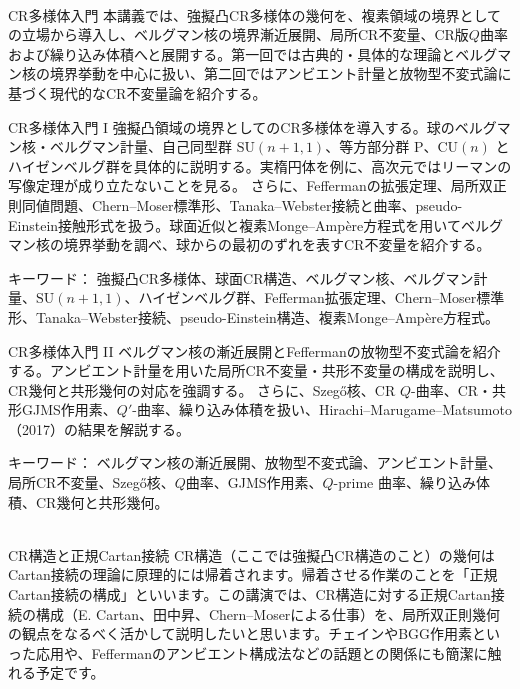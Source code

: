 \documentclass[dvipdfmx,a4paper,12pt]{article}
\theoremstyle{plain} %
\theoremstyle{definition} %
\begin{document}
\newpage

\vskip5mm

\vskip5mm


 \\
CR多様体入門
\vskip3mm
本講義では、強擬凸CR多様体の幾何を、複素領域の境界としての立場から導入し、ベルグマン核の境界漸近展開、局所CR不変量、CR版\(Q\)曲率および繰り込み体積へと展開する。第一回では古典的・具体的な理論とベルグマン核の境界挙動を中心に扱い、第二回ではアンビエント計量と放物型不変式論に基づく現代的なCR不変量論を紹介する。
\vskip8mm


CR多様体入門 I
\vskip3mm
強擬凸領域の境界としてのCR多様体を導入する。球のベルグマン核・ベルグマン計量、自己同型群 \(\mathrm{SU}(n+1,1)\)、等方部分群 \(\mathrm{P}\)、\(\mathrm{CU}(n)\) とハイゼンベルグ群を具体的に説明する。実楕円体を例に、高次元ではリーマンの写像定理が成り立たないことを見る。
さらに、Feffermanの拡張定理、局所双正則同値問題、Chern--Moser標準形、Tanaka--Webster接続と曲率、pseudo-Einstein接触形式を扱う。球面近似と複素Monge--Amp\`ere方程式を用いてベルグマン核の境界挙動を調べ、球からの最初のずれを表すCR不変量を紹介する。

\vskip1mm
キーワード： 強擬凸CR多様体、球面CR構造、ベルグマン核、ベルグマン計量、\(\mathrm{SU}(n+1,1)\)、ハイゼンベルグ群、Fefferman拡張定理、Chern--Moser標準形、Tanaka--Webster接続、pseudo-Einstein構造、複素Monge--Amp\`ere方程式。
\vskip8mm


CR多様体入門 II
\vskip3mm
ベルグマン核の漸近展開とFeffermanの放物型不変式論を紹介する。アンビエント計量を用いた局所CR不変量・共形不変量の構成を説明し、CR幾何と共形幾何の対応を強調する。
さらに、Szeg\H{o}核、CR \(Q\)-曲率、CR・共形GJMS作用素、\(Q'\)-曲率、繰り込み体積を扱い、Hirachi--Marugame--Matsumoto（2017）の結果を解説する。

\vskip1mm
キーワード： ベルグマン核の漸近展開、放物型不変式論、アンビエント計量、局所CR不変量、Szeg\H{o}核、\(Q\)曲率、GJMS作用素、\(Q\)-prime 曲率、繰り込み体積、CR幾何と共形幾何。
\vskip8mm

\newpage

\vskip5mm

\\
CR構造と正規Cartan接続
\vskip3mm
CR構造（ここでは強擬凸CR構造のこと）の幾何はCartan接続の理論に原理的には帰着されます。帰着させる作業のことを「正規Cartan接続の構成」といいます。この講演では、CR構造に対する正規Cartan接続の構成（E. Cartan、田中昇、Chern--Moserによる仕事）を、局所双正則幾何の観点をなるべく活かして説明したいと思います。チェインやBGG作用素といった応用や、Feffermanのアンビエント構成法などの話題との関係にも簡潔に触れる予定です。
\vskip8mm
\end{document}
